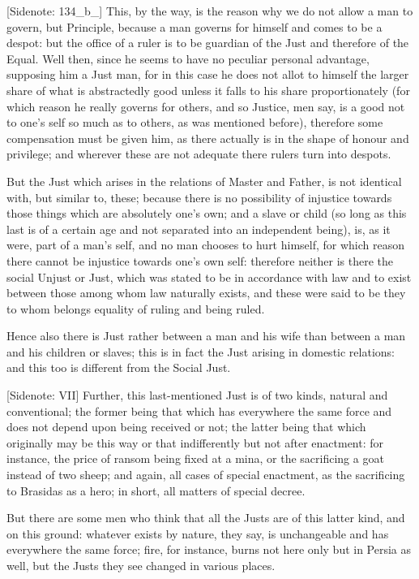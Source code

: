 [Sidenote: 134_b_] This, by the way, is the reason why we do not allow
a man to govern, but Principle, because a man governs for himself and
comes to be a despot: but the office of a ruler is to be guardian of the
Just and therefore of the Equal. Well then, since he seems to have no
peculiar personal advantage, supposing him a Just man, for in this case
he does not allot to himself the larger share of what is abstractedly
good unless it falls to his share proportionately (for which reason he
really governs for others, and so Justice, men say, is a good not to
one's self so much as to others, as was mentioned before), therefore
some compensation must be given him, as there actually is in the shape
of honour and privilege; and wherever these are not adequate there
rulers turn into despots.

But the Just which arises in the relations of Master and Father, is not
identical with, but similar to, these; because there is no possibility
of injustice towards those things which are absolutely one's own; and
a slave or child (so long as this last is of a certain age and not
separated into an independent being), is, as it were, part of a man's
self, and no man chooses to hurt himself, for which reason there cannot
be injustice towards one's own self: therefore neither is there the
social Unjust or Just, which was stated to be in accordance with law and
to exist between those among whom law naturally exists, and these were
said to be they to whom belongs equality of ruling and being ruled.

Hence also there is Just rather between a man and his wife than between
a man and his children or slaves; this is in fact the Just arising in
domestic relations: and this too is different from the Social Just.

[Sidenote: VII] Further, this last-mentioned Just is of two kinds,
natural and conventional; the former being that which has everywhere the
same force and does not depend upon being received or not; the latter
being that which originally may be this way or that indifferently but
not after enactment: for instance, the price of ransom being fixed at
a mina, or the sacrificing a goat instead of two sheep; and again, all
cases of special enactment, as the sacrificing to Brasidas as a hero; in
short, all matters of special decree.

But there are some men who think that all the Justs are of this latter
kind, and on this ground: whatever exists by nature, they say, is
unchangeable and has everywhere the same force; fire, for instance,
burns not here only but in Persia as well, but the Justs they see
changed in various places.

